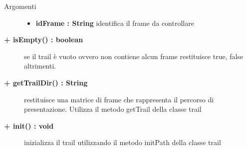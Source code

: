 \begin{description}
\begin{description}
		\begin{description}
			\item[Argomenti] \hfill
				\begin{itemize}
				
					\item \textbf{idFrame : String			} \hfill
						identifica il frame da controllare
					
				\end{itemize}
		\end{description}
	\end{description}
	
	\begin{description}
		\item[\textbf{\color{blue}+ isEmpty() : boolean			}] \hfill
			se il trail è vuoto ovvero non contiene alcun frame restituisce true, false altrimenti.
			
	\end{description}
	
	\begin{description}
		\item[\textbf{\color{blue}+ getTrailDir() : String			}] \hfill
			restituisce una matrice di frame che rappresenta il percorso di presentazione. Utilizza il metodo getTrail della classe trail

	\end{description}
	
	\begin{description}
		\item[\textbf{\color{blue}+ init() : void			}] \hfill
			inizializza il trail utilizzando il metodo initPath della classe trail
		
	\end{description}
		
\end{description}
